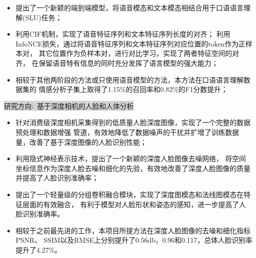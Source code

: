 \documentclass{resume}
\begin{document}
\begin{itemize}[parsep=1.0ex]
  \item 提出了一个新颖的端到端模型，将语音模态和文本模态相结合用于口语语言理解(SLU)任务；
  \item 利用CIF机制，实现了语音特征序列和文本特征序列长度的对齐；
        利用InfoNCE损失，通过将语音特征序列和文本特征序列对应位置的token作为正样本对，
        其它位置作为负样本对，进行对比学习，实现了两者特征空间的对齐，
        在保留语音特有信息的同时充分发挥了语言模型的强大能力；
  \item 相较于其他两阶段的方法或只使用语音模型的方法，本方法在口语语言理解数据集的
        情感分析子集上取得了1.15\%的召回率和0.82\%的F1分数提升；
\end{itemize}
\colorbox{lightgray}{研究方向:\ 基于深度相机的人脸和人体分析}
\href{https://www.sciencedirect.com/science/article/pii/S0031320323006349}{\textcolor{linkcolor}{\faExternalLink{}}}
\begin{itemize}[parsep=1.0ex]
  \item 针对消费级深度相机采集得到的低质量人脸深度图像，实现了一个完整的数据预处理和数据增强
        管道，有效地降低了数据噪声的干扰并扩增了训练数据量，改善了基于深度图像的人脸识别性能；
  \item 利用隐式神经表示技术，提出了一个新颖的深度人脸图像去噪网络，
        将空间坐标信息作为深度人脸去噪和细化的先验，有效地改善了深度人脸图像的质量
        并提高了人脸识别准确率；
  \item 提出了一个轻量级的分组卷积融合模块，实现了深度图模态和法线图模态在特征层面的有效融合，
        有利于模型对人脸形状和姿态的感知，进一步提高了人脸识别准确率。
  \item 相较于之前最先进的工作，本项目所提方法在深度人脸图像的去噪和细化指标PSNR、
        SSIM以及RMSE上分别提升了0.56db，0.96和0.117，总体人脸识别率提升了4.27\%。
\end{itemize}
\end{document}
